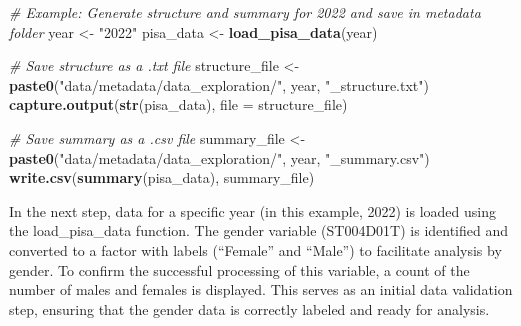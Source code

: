 \documentclass[
]{article}
\newenvironment{Shaded}{\begin{snugshade}}{\end{snugshade}}
\newcommand{\AttributeTok}[1]{\textcolor[rgb]{0.13,0.29,0.53}{#1}}
\newcommand{\CommentTok}[1]{\textcolor[rgb]{0.56,0.35,0.01}{\textit{#1}}}
\newcommand{\FunctionTok}[1]{\textcolor[rgb]{0.13,0.29,0.53}{\textbf{#1}}}
\newcommand{\NormalTok}[1]{#1}
\newcommand{\OtherTok}[1]{\textcolor[rgb]{0.56,0.35,0.01}{#1}}
\newcommand{\StringTok}[1]{\textcolor[rgb]{0.31,0.60,0.02}{#1}}
\begin{document}
\begin{Shaded}
\begin{Highlighting}[]
\CommentTok{\# Example: Generate structure and summary for 2022 and save in metadata folder}
\NormalTok{year }\OtherTok{\textless{}{-}} \StringTok{"2022"}
\NormalTok{pisa\_data }\OtherTok{\textless{}{-}} \FunctionTok{load\_pisa\_data}\NormalTok{(year)}

\CommentTok{\# Save structure as a .txt file}
\NormalTok{structure\_file }\OtherTok{\textless{}{-}} \FunctionTok{paste0}\NormalTok{(}\StringTok{"data/metadata/data\_exploration/"}\NormalTok{, year, }\StringTok{"\_structure.txt"}\NormalTok{)}
\FunctionTok{capture.output}\NormalTok{(}\FunctionTok{str}\NormalTok{(pisa\_data), }\AttributeTok{file =}\NormalTok{ structure\_file)}

\CommentTok{\# Save summary as a .csv file}
\NormalTok{summary\_file }\OtherTok{\textless{}{-}} \FunctionTok{paste0}\NormalTok{(}\StringTok{"data/metadata/data\_exploration/"}\NormalTok{, year, }\StringTok{"\_summary.csv"}\NormalTok{)}
\FunctionTok{write.csv}\NormalTok{(}\FunctionTok{summary}\NormalTok{(pisa\_data), summary\_file)}
\end{Highlighting}
\end{Shaded}

In the next step, data for a specific year (in this example, 2022) is
loaded using the load\_pisa\_data function. The gender variable
(ST004D01T) is identified and converted to a factor with labels
(``Female'' and ``Male'') to facilitate analysis by gender. To confirm
the successful processing of this variable, a count of the number of
males and females is displayed. This serves as an initial data
validation step, ensuring that the gender data is correctly labeled and
ready for analysis.
\end{document}
